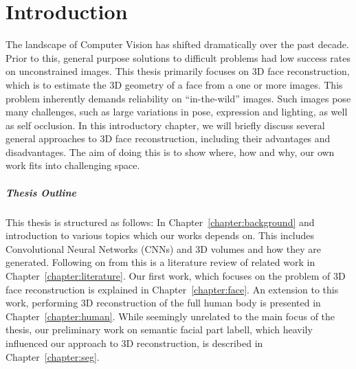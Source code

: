 \chapter{Introduction}

The landscape of Computer Vision has shifted dramatically over the
past decade. Prior to this, general purpose solutions to difficult
problems had low success rates on unconstrained images. This thesis
primarily focuses on 3D face reconstruction, which is to estimate the
3D geometry of a face from a one or more images. This problem
inherently demands reliability on ``in-the-wild'' images. Such images
pose many challenges, such as large variations in pose, expression and
lighting, as well as self occlusion. In this introductory chapter, we
will briefly discuss several general approaches to 3D face
reconstruction, including their advantages and disadvantages. The aim
of doing this is to show where, how and why, our own work fits into
challenging space.






\paragraph{Thesis Outline} This thesis is structured as follows: In
Chapter~\ref{chapter:background} and introduction to various topics
which our works depends on. This includes Convolutional Neural
Networks (CNNs) and 3D volumes and how they are generated. Following
on from this is a literature review of related work in
Chapter~\ref{chapter:literature}. Our first work, which focuses on the
problem of 3D face reconstruction is explained in
Chapter~\ref{chapter:face}. An extension to this work, performing 3D
reconstruction of the full human body is presented in
Chapter~\ref{chapter:human}. While seemingly unrelated to the main
focus of the thesis, our preliminary work on semantic facial part
labell, which heavily influenced our approach to 3D reconstruction, is
described in Chapter~\ref{chapter:seg}.




